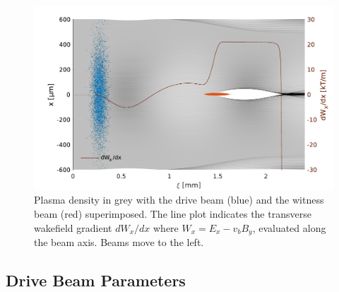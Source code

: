 \documentclass[aps,prstab,reprint,amsmath,amssymb,groupedaddress]{revtex4-1}
\begin{document}

\begin{figure}[hbt]
    \includegraphics[width=\linewidth,trim={2mm 0mm 2mm 0mm},clip]{figures/plasmaDenTWake}
    \caption{\label{Fig:PlasmaDenTWake} Plasma density in grey with the drive beam (blue) and the witness beam (red)
        superimposed. The line plot indicates the transverse wakefield gradient $dW_{x}/dx$ where
        $W_{x} = E_{x} - v_{b} B_{y}$, evaluated along the beam axis. Beams move to the left.}
\end{figure}

\subsection{Drive Beam Parameters}\label{S:M:Setup}
\end{document}
